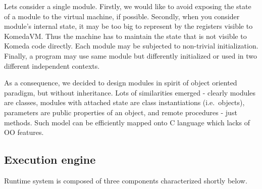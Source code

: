 \documentclass{article}
\begin{document}
Lets consider a single module. Firstly, we would like to avoid exposing the
state of a module to the virtual machine, if possible. Secondly, when you
consider module's internal state, it may be too big to represent by the
registers visible to KomedaVM. Thus the machine has to maintain the state that
is not visible to Komeda code directly. Each module may be subjected to
non-trivial initialization. Finally, a program may use same module but
differently initialized or used in two different independent contexts.

As a consequence, we decided to design modules in spirit of object oriented
paradigm, but without inheritance. Lots of similarities emerged - clearly
modules are classes, modules with attached state are class instantiations
(i.e.~objects), parameters are public properties of an object, and remote
procedures - just methods. Such model can be efficiently mapped onto C language
which lacks of OO features.

\subsection{Execution engine}

Runtime system is composed of three components characterized shortly below.
\end{document}

